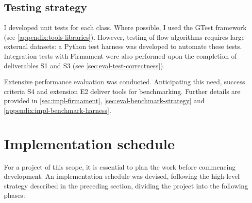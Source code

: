 
\subsection{Testing strategy}
\label{sec:prep-management-testing}
I developed unit tests for each class. Where possible, I used the GTest framework (see \cref{appendix:tools-libraries}). However, testing of flow algorithms requires large external datasets: a Python test harness was developed to automate these tests. Integration tests with Firmament were also performed upon the completion of deliverables S1 and S3 (see \cref{sec:eval-test-correctness}).

Extensive performance evaluation was conducted. Anticipating this need, success criteria S4 and extension E2 deliver tools for benchmarking. Further details are provided in \cref{sec:impl-firmament}, \cref{sec:eval-benchmark-strategy} and \cref{appendix:impl-benchmark-harness}.

\section{Implementation schedule} \label{sec:prep-implsched}

%


For a project of this scope, it is essential to plan the work before commencing development. An implementation schedule was devised, following the high-level strategy described in the preceding section, dividing the project into the following phases:

